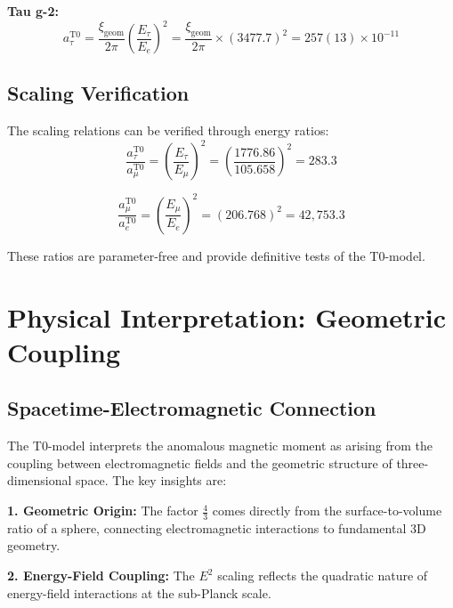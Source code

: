 \documentclass[12pt,a4paper]{report}
\newcommand{\xigeom}{\xi_{\text{geom}}}   %
\newcommand{\Ee}{E_e}                     %
\newcommand{\Emu}{E_\mu}                  %
\newcommand{\Etau}{E_\tau}                %
\begin{document}
\textbf{Tau g-2:}
\begin{equation}
	a_\tau^{\text{T0}} = \frac{\xigeom}{2\pi} \left(\frac{\Etau}{\Ee}\right)^2 = \frac{\xigeom}{2\pi} \times (3477.7)^2 = 257(13) \times 10^{-11}
	\label{eq:tau_g2}
\end{equation}

\subsection{Scaling Verification}
\label{subsec:scaling_verification}

The scaling relations can be verified through energy ratios:
\begin{equation}
	\frac{a_\tau^{\text{T0}}}{a_\mu^{\text{T0}}} = \left(\frac{\Etau}{\Emu}\right)^2 = \left(\frac{1776.86}{105.658}\right)^2 = 283.3
	\label{eq:tau_muon_ratio}
\end{equation}

\begin{equation}
	\frac{a_\mu^{\text{T0}}}{a_e^{\text{T0}}} = \left(\frac{\Emu}{\Ee}\right)^2 = (206.768)^2 = 42,753.3
	\label{eq:muon_electron_ratio}
\end{equation}

These ratios are parameter-free and provide definitive tests of the T0-model.

\section{Physical Interpretation: Geometric Coupling}
\label{sec:physical_interpretation}

\subsection{Spacetime-Electromagnetic Connection}
\label{subsec:spacetime_electromagnetic}

The T0-model interprets the anomalous magnetic moment as arising from the coupling between electromagnetic fields and the geometric structure of three-dimensional space. The key insights are:

\textbf{1. Geometric Origin:}
The factor $\frac{4}{3}$ comes directly from the surface-to-volume ratio of a sphere, connecting electromagnetic interactions to fundamental 3D geometry.

\textbf{2. Energy-Field Coupling:}
The $E^2$ scaling reflects the quadratic nature of energy-field interactions at the sub-Planck scale.
\end{document}
